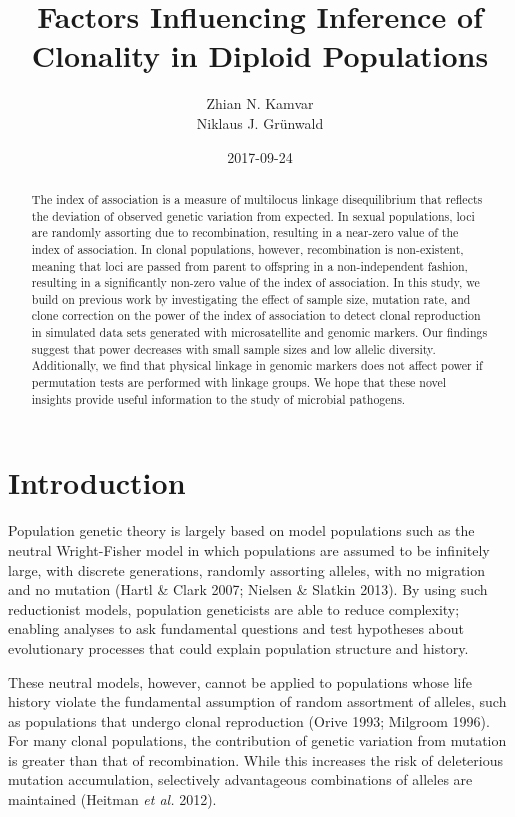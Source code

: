 \documentclass[]{article}
\title{Factors Influencing Inference of Clonality in Diploid Populations}
\author{Zhian N. Kamvar \\ Niklaus J. Grünwald}
\date{2017-09-24}
\theoremstyle{definition}
\theoremstyle{definition}
\theoremstyle{definition}
\theoremstyle{remark}
\begin{document}
\maketitle
\begin{abstract}
The index of association is a measure of multilocus linkage
disequilibrium that reflects the deviation of observed genetic variation
from expected. In sexual populations, loci are randomly assorting due to
recombination, resulting in a near-zero value of the index of
association. In clonal populations, however, recombination is
non-existent, meaning that loci are passed from parent to offspring in a
non-independent fashion, resulting in a significantly non-zero value of
the index of association. In this study, we build on previous work by
investigating the effect of sample size, mutation rate, and clone
correction on the power of the index of association to detect clonal
reproduction in simulated data sets generated with microsatellite and
genomic markers. Our findings suggest that power decreases with small
sample sizes and low allelic diversity. Additionally, we find that
physical linkage in genomic markers does not affect power if permutation
tests are performed with linkage groups. We hope that these novel
insights provide useful information to the study of microbial pathogens.
\end{abstract}

\section{Introduction}\label{introduction}

Population genetic theory is largely based on model populations such as
the neutral Wright-Fisher model in which populations are assumed to be
infinitely large, with discrete generations, randomly assorting alleles,
with no migration and no mutation (Hartl \& Clark 2007; Nielsen \&
Slatkin 2013). By using such reductionist models, population geneticists
are able to reduce complexity; enabling analyses to ask fundamental
questions and test hypotheses about evolutionary processes that could
explain population structure and history.

These neutral models, however, cannot be applied to populations whose
life history violate the fundamental assumption of random assortment of
alleles, such as populations that undergo clonal reproduction (Orive
1993; Milgroom 1996). For many clonal populations, the contribution of
genetic variation from mutation is greater than that of recombination.
While this increases the risk of deleterious mutation accumulation,
selectively advantageous combinations of alleles are maintained (Heitman
\emph{et al.} 2012).
\end{document}
